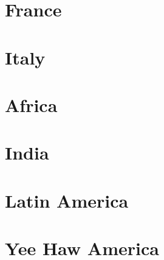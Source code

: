 \documentclass[twosides, 11pt]{book}
\begin{document}
\chapter{France}

%
%

\chapter{Italy}
%
%
%

\chapter{Africa}
%

\chapter{India}
%

\chapter{Latin America}

%
%

%
%
%
%

\chapter{Yee Haw America}

%
%
%



\clearpage
\printindex
\end{document}
